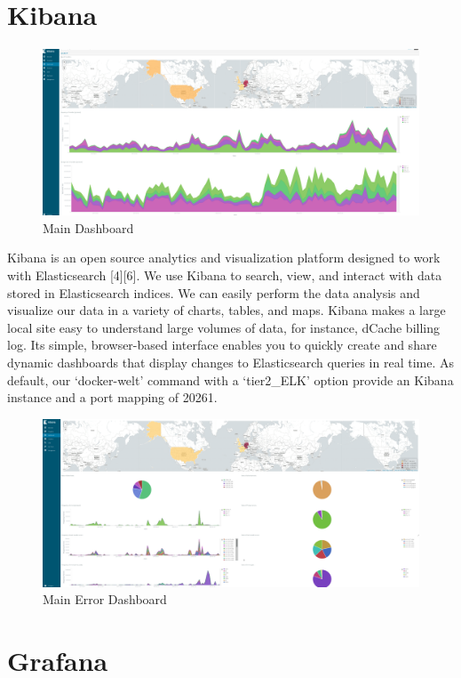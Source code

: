 \documentclass[]{article}
\begin{document}
\section{Kibana}\label{kibana}

\begin{figure}[htbp]
\centering
\includegraphics{images/kibana.png}
\caption{Main Dashboard}
\end{figure}

Kibana is an open source analytics and visualization platform designed
to work with Elasticsearch {[}4{]}{[}6{]}. We use Kibana to search,
view, and interact with data stored in Elasticsearch indices. We can
easily perform the data analysis and visualize our data in a variety of
charts, tables, and maps. Kibana makes a large local site easy to
understand large volumes of data, for instance, dCache billing log. Its
simple, browser-based interface enables you to quickly create and share
dynamic dashboards that display changes to Elasticsearch queries in real
time. As default, our `docker-welt' command with a `tier2\_ELK' option
provide an Kibana instance and a port mapping of 20261.

\begin{figure}[htbp]
\centering
\includegraphics{images/kibana_error.png}
\caption{Main Error Dashboard}
\end{figure}

\section{Grafana}\label{grafana}
\end{document}
